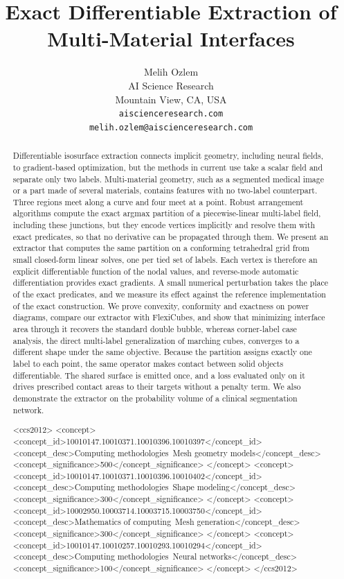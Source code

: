 \documentclass{egpubl}
\title[Exact Differentiable Extraction of Multi-Material Interfaces]%
      {Exact Differentiable Extraction of Multi-Material Interfaces}
\author[M. Ozlem]{Melih Ozlem\\ AI Science Research\\ Mountain View, CA, USA\\ \texttt{aiscienceresearch.com}\\ \texttt{melih.ozlem@aiscienceresearch.com}}
\theoremstyle{definition}
\begin{document}
\maketitle

\begin{abstract}
Differentiable isosurface extraction connects implicit geometry, including
neural fields, to gradient-based optimization, but the methods in current use take a scalar
field and separate only two labels. Multi-material geometry, such as a
segmented medical image or a part made of several materials, contains features
with no two-label counterpart. Three regions meet along a curve and four meet
at a point. Robust arrangement algorithms compute the exact argmax partition of
a piecewise-linear multi-label field, including these junctions, but they
encode vertices implicitly and resolve them with exact predicates, so that no
derivative can be propagated through them. We present an extractor that
computes the same partition on a conforming tetrahedral grid from small
closed-form linear solves, one per tied set of labels. Each vertex is therefore
an explicit differentiable function of the nodal values, and reverse-mode
automatic differentiation provides exact gradients. A small numerical perturbation
takes the place of the exact predicates, and we measure its effect
against the reference implementation of the exact construction. We prove
convexity, conformity and exactness on power diagrams, compare our extractor
with FlexiCubes, and show that minimizing
interface area through it recovers the standard double bubble, whereas
corner-label case analysis, the direct multi-label generalization of marching
cubes, converges to a different shape under the same objective. Because the
partition assigns exactly one label to each point, the same operator makes
contact between solid objects differentiable. The shared surface is emitted
once, and a loss evaluated only on it drives prescribed contact areas to their
targets without a penalty term. We also demonstrate the extractor on the
probability volume of a clinical segmentation network.

\begin{CCSXML}
<ccs2012>
<concept>
<concept_id>10010147.10010371.10010396.10010397</concept_id>
<concept_desc>Computing methodologies~Mesh geometry models</concept_desc>
<concept_significance>500</concept_significance>
</concept>
<concept>
<concept_id>10010147.10010371.10010396.10010402</concept_id>
<concept_desc>Computing methodologies~Shape modeling</concept_desc>
<concept_significance>300</concept_significance>
</concept>
<concept>
<concept_id>10002950.10003714.10003715.10003750</concept_id>
<concept_desc>Mathematics of computing~Mesh generation</concept_desc>
<concept_significance>300</concept_significance>
</concept>
<concept>
<concept_id>10010147.10010257.10010293.10010294</concept_id>
<concept_desc>Computing methodologies~Neural networks</concept_desc>
<concept_significance>100</concept_significance>
</concept>
</ccs2012>
\end{CCSXML}


\end{abstract}
\end{document}
